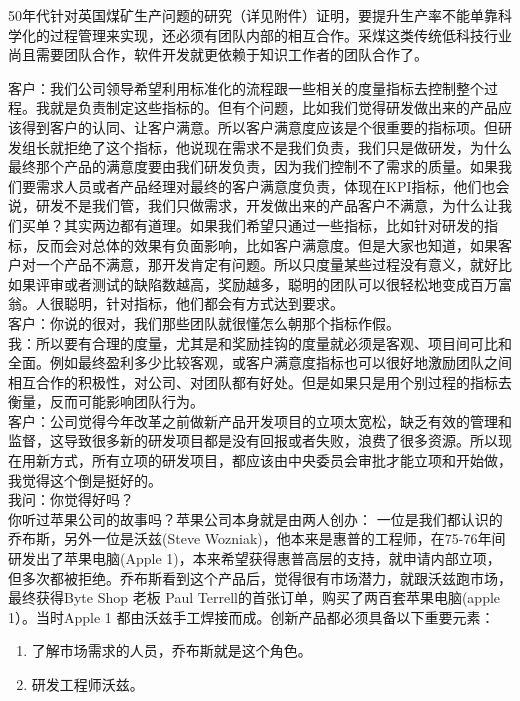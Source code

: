 50年代针对英国煤矿生产问题的研究（详见附件）证明，要提升生产率不能单靠科学化的过程管理来实现，还必须有团队内部的相互合作。采煤这类传统低科技行业尚且需要团队合作，软件开发就更依赖于知识工作者的团队合作了。

客户：我们公司领导希望利用标准化的流程跟一些相关的度量指标去控制整个过程。我就是负责制定这些指标的。但有个问题，比如我们觉得研发做出来的产品应该得到客户的认同、让客户满意。所以客户满意度应该是个很重要的指标项。但研发组长就拒绝了这个指标，他说现在需求不是我们负责，我们只是做研发，为什么最终那个产品的满意度要由我们研发负责，因为我们控制不了需求的质量。如果我们要需求人员或者产品经理对最终的客户满意度负责，体现在KPI指标，他们也会说，研发不是我们管，我们只做需求，开发做出来的产品客户不满意，为什么让我们买单？其实两边都有道理。如果我们希望只通过一些指标，比如针对研发的指标，反而会对总体的效果有负面影响，比如客户满意度。但是大家也知道，如果客户对一个产品不满意，那开发肯定有问题。所以只度量某些过程没有意义，就好比如果评审或者测试的缺陷数越高，奖励越多，聪明的团队可以很轻松地变成百万富翁。人很聪明，针对指标，他们都会有方式达到要求。\\
客户：你说的很对，我们那些团队就很懂怎么朝那个指标作假。\\
我：所以要有合理的度量，尤其是和奖励挂钩的度量就必须是客观、项目间可比和全面。例如最终盈利多少比较客观，或客户满意度指标也可以很好地激励团队之间相互合作的积极性，对公司、对团队都有好处。但是如果只是用个别过程的指标去衡量，反而可能影响团队行为。\\
客户：公司觉得今年改革之前做新产品开发项目的立项太宽松，缺乏有效的管理和监督，这导致很多新的研发项目都是没有回报或者失败，浪费了很多资源。所以现在用新方式，所有立项的研发项目，都应该由中央委员会审批才能立项和开始做，我觉得这个倒是挺好的。\\
我问：你觉得好吗？\\
你听过苹果公司的故事吗？苹果公司本身就是由两人创办：
一位是我们都认识的乔布斯，另外一位是沃兹(Steve
Wozniak)，他本来是惠普的工程师，在75-76年间研发出了苹果电脑(Apple
1)，本来希望获得惠普高层的支持，就申请内部立项，但多次都被拒绝。乔布斯看到这个产品后，觉得很有市场潜力，就跟沃兹跑市场，最终获得Byte
Shop 老板 Paul Terrell的首张订单，购买了两百套苹果电脑(apple
1）。当时Apple 1 都由沃兹手工焊接而成。创新产品都必须具备以下重要元素：

\begin{enumerate}
\tightlist
\item
  了解市场需求的人员，乔布斯就是这个角色。
\item
  研发工程师沃兹。
\end{enumerate}

